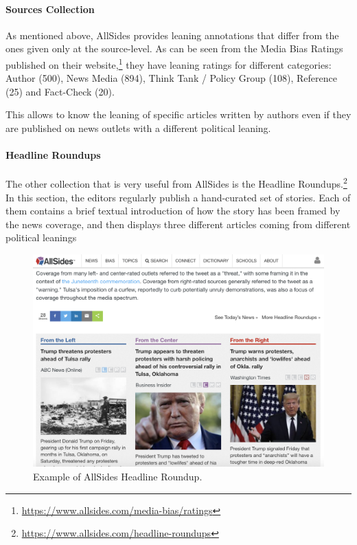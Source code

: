 \paragraph{Sources Collection}

As mentioned above, AllSides provides leaning annotations that differ from  the ones given only at the source-level.
As can be seen from the Media Bias Ratings published on their website,\footnote{\url{https://www.allsides.com/media-bias/ratings}} they have leaning ratings for different categories: Author (500), News Media (894), Think Tank / Policy Group (108), Reference (25) and Fact-Check (20).

This allows to know the leaning of specific articles written by authors even if they are published on news outlets with a different political leaning. 


\paragraph{Headline Roundups\texttrademark}

The other collection that is very useful from AllSides is the Headline Roundups\texttrademark.\footnote{\url{https://www.allsides.com/headline-roundups}} In this section, the editors regularly publish a hand-curated set of stories. Each of them contains a brief textual introduction of how the story has been framed by the news coverage, and then displays three different articles coming from different political leanings


\begin{figure}[!htbp]
    \centering
    \includegraphics[width=\linewidth]{figures/allsides.png}
    \caption{Example of AllSides Headline Roundup.}
    \label{fig:allsides}
\end{figure}

